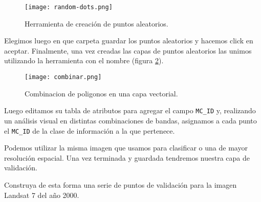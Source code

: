 \begin{exa}
  \begin{figure}[h!]
    \centering
    \texttt{[image: random-dots.png]}
    \caption{Herramienta de creaci\'on de puntos aleatorios.}
    \label{fig:dots}
  \end{figure}

  Elegimos luego en que carpeta guardar los puntos aleatorios y hacemos click en aceptar. Finalmente, una vez creadas las capas de puntos aleatorios las unimos utilizando la herramienta  con el nombre  (figura \ref{fig:combinar}).

  \begin{figure}[h!]
    \centering
    \texttt{[image: combinar.png]}
    \caption{Combinacion de poligonos en una capa vectorial.}
    \label{fig:combinar}
  \end{figure}

  Luego editamos su tabla de atributos para agregar el campo \verb|MC_ID| y, realizando un an\'alisis visual en distintas combinaciones de bandas, asignamos a cada punto el \verb|MC_ID| de la clase de informaci\'on a la que pertenece.

  Podemos utilizar la misma imagen que usamos para clasificar o una de mayor resoluci\'on espacial. Una vez terminada y guardada tendremos nuestra capa de validaci\'on.

\end{exa}

\begin{act}
  Construya de esta forma una serie de puntos de validaci\'on para la imagen Landsat 7 del a\~no 2000.
\end{act}

